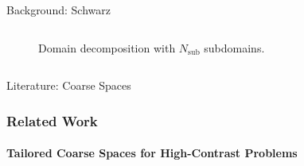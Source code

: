 \begin{frame}[label=background,fragile]{Background: Schwarz}
\begin{columns}[T,onlytextwidth]
\begin{column}{.49\textwidth}
{\begin{figure}[H]
                    \centering
                    
                    \caption{Domain decomposition with $N_{\text{sub}}$ subdomains.}
                \end{figure}
            }
        \end{column}
    \end{columns}
\end{frame}

\footerinfootnotesfalse
\begin{frame}[label=background]{Literature: Coarse Spaces}
    \frametitle{Related Work}
    \framesubtitle{Tailored Coarse Spaces for High-Contrast Problems}
\end{frame}
